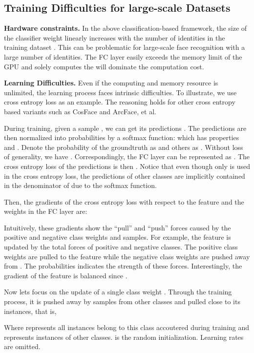 \documentclass[10pt,twocolumn,letterpaper]{article}
\begin{document}
\subsection{Training Difficulties for large-scale Datasets} \label{sec:difficulty}
\textbf{Hardware constraints.} In the above classification-based framework, the size of the classifier weight  linearly increases with the number of identities in the training dataset . This can be problematic for large-scale face recognition with a large number of identities. The FC layer easily exceeds the memory limit of the GPU and solely computes the  will dominate the computation cost.

\textbf{Learning Difficulties.} Even if the computing and memory resource is unlimited, the learning process faces intrinsic difficulties. To illustrate, we use cross entropy loss as an example. The reasoning holds for other cross entropy based variants such as CosFace and ArcFace, et al. 

During training, given a sample , we can get its predictions .  The predictions are then normalized into probabilities by a softmax function:  which has properties  and .
Denote the probability of the groundtruth as  and others as . Without loss of generality, we have . Correspondingly, the FC layer can be represented as . The cross entropy loss of the predictions is then . Notice that even though only  is used in the cross entropy loss, the predictions of other classes are implicitly contained in the denominator of  due to the softmax function.

Then, the gradients of the cross entropy loss  with respect to the feature  and the weights in the FC layer are:

   
Intuitively, these gradients show the ``pull'' and ``push'' forces caused by the positive and negative class weights and samples. For example, the feature  is updated by the total forces of positive and negative classes. The positive class weights  are pulled to the feature  while the negative class weights  are pushed away from . The probabilities  indicates the strength of these forces. Interestingly, the gradient of the feature is balanced since . 

Now lets focus on the update of a single class weight . Through the training process, it is pushed away by samples from other classes and pulled close to its instances, that is,


Where  represents all instances belong to this class accoutered during training and  represents instances of other classes.  is the random initialization. Learning rates are omitted. 
\end{document}
